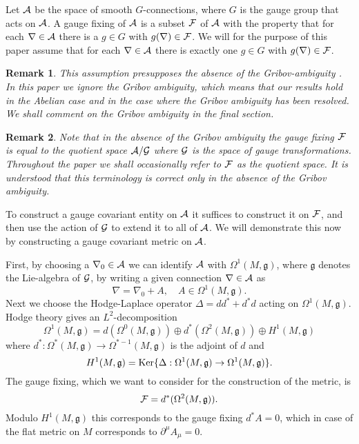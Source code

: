 \documentclass[letterpaper,12pt]{article}
\def\ca{{\cal A}}
\def\cf{{\cal F}}
\def\cg{{\cal G}}
\newtheorem{remark}{Remark}
\begin{document}
Let $\ca$ be the space of smooth $G$-connections, where $G$ is the gauge group that acts on $\ca$. A gauge fixing of $\ca$ is a subset $\cf$ of $\ca$ with the property that for each $\nabla \in \ca$ there is a $g\in G$ with $g(\nabla )\in \cf$. We will for the  purpose of this paper assume that for each $\nabla \in \ca$ there is exactly  one $g\in G$  with $g(\nabla )\in \cf$. 
\begin{remark}
This assumption presupposes the absence of the Gribov-ambiguity \cite{Gribov:1977wm,Singer:1978dk}. In this paper we ignore the Gribov ambiguity, which means that our results hold in the Abelian case and in the case where the Gribov ambiguity has been resolved. We shall comment on the Gribov ambiguity in the final section. 
\end{remark}
\begin{remark}
Note that in the absence of the Gribov ambiguity the gauge fixing $\cf$ is equal to the quotient space $\ca/\cg$ where $\cg$ is the space of gauge transformations. Throughout the paper we shall occasionally refer to $\cf$ as the quotient space. It is understood that this terminology is correct only in the absence of the Gribov ambiguity.
\end{remark}
To construct a gauge covariant entity on $\ca$ it suffices to construct it on $\cf$, and then use the action of $\cg$ to extend it to all of $\ca$.
We will demonstrate this now  by constructing a gauge covariant metric on $\ca$.



First, by choosing a $\nabla_0 \in \ca$ we can identify $\ca$ with $\Omega^1(M,\mathfrak{g})$, where $\mathfrak{g}$ denotes the Lie-algebra of $\cg$, by writing a given connection $\nabla \in \ca$ as
$$\nabla=\nabla_0+A, \quad A\in \Omega^1(M,\mathfrak{g}). $$
Next we choose the Hodge-Laplace operator $\Delta=dd^*+d^*d$ acting on $\Omega^1(M,\mathfrak{g})$. Hodge theory gives an $L^2$-decomposition 
$$\Omega^1(M,\mathfrak{g})=d(\Omega^0(M,\mathfrak{g}))\oplus  d^*(\Omega^2(M,\mathfrak{g}))\oplus H^1(M,\mathfrak{g}) $$
where $d^* :\Omega^*(M,\mathfrak{g}) \to \Omega^{*-1}(M,\mathfrak{g})$ is the adjoint of $d$ and   
$$H^1(M,\mathfrak{g}) =\hbox{Ker}\{  \Delta :\Omega^1(M,\mathfrak{g})\to \Omega^1(M,\mathfrak{g})  \}.$$
The gauge fixing, which we want to consider for the construction of the metric, is 
$$\cf=d^* (\Omega^2 (M,\mathfrak{g})) .$$
Modulo $H^1(M,\mathfrak{g})$ this corresponds to the gauge fixing $d^*A=0$, which in case of the flat metric on $M$ corresponds to $\partial^\mu A_\mu=0$.
\end{document}
